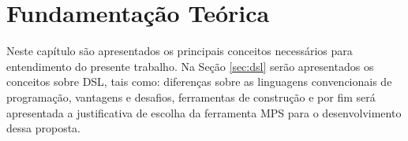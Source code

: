 \chapter{Fundamentação Teórica}
\label{chap:fundamentacao}

Neste capítulo são apresentados os principais conceitos necessários para entendimento do presente trabalho. Na Seção \ref{sec:dsl} serão apresentados os conceitos sobre \gls{DSL}, tais como: diferenças sobre as linguagens convencionais de programação, vantagens e desafios, ferramentas de construção e por fim será apresentada a justificativa de escolha da ferramenta \gls{MPS} para o desenvolvimento dessa proposta.






